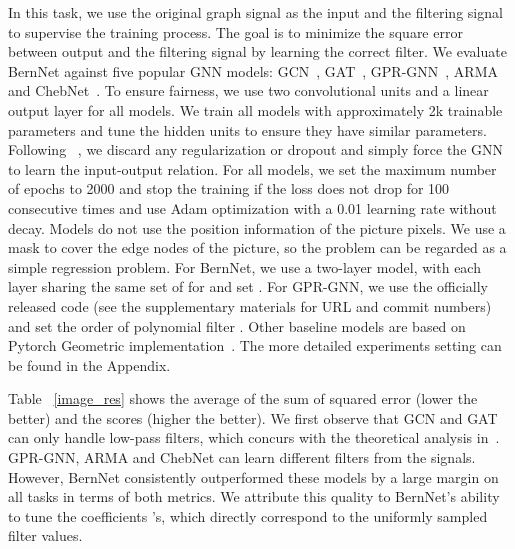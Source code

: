 \documentclass{article}
\begin{document}
In this task, we use the original graph signal as the input and the filtering signal to supervise the training process. The goal is to minimize the square error between output and the filtering signal by learning the correct filter. We evaluate BernNet against  five popular GNN models: GCN~\cite{kipf2016semi}, GAT~\cite{gat}, GPR-GNN~\cite{chien2021GPR-GNN}, ARMA~\cite{bianchi2021ARMA} and ChebNet~\cite{Chebnet}. To ensure fairness, we use two convolutional units and a linear output layer for all models. We train all models with approximately 2k trainable parameters and tune the hidden units to ensure they have similar parameters. Following ~\cite{balcilar2021analyzing}, we discard any regularization or dropout and simply force the GNN to learn the input-output relation. For all models, we set the maximum number of epochs to 2000 and stop the training if the loss does not drop for 100 consecutive times and use Adam optimization with a 0.01 learning rate without decay. Models do not use the position information of the picture pixels. We use a mask to cover the edge nodes of the picture, so the problem can be regarded as a simple regression problem. 
For BernNet, we use a two-layer model, with each layer sharing the same set of  for  and set . For GPR-GNN, we use the officially released code (see the supplementary materials for URL and commit numbers) and set the order of polynomial filter . Other baseline models are based on Pytorch Geometric implementation~\cite{fey2019fast}. The more detailed experiments setting can be found in the Appendix. 


Table ~\ref{image_res} shows the average of the sum of squared error (lower the better) and the  scores (higher the better).
We first observe that GCN and GAT can only handle low-pass filters, which concurs with the theoretical analysis in~\cite{balcilar2021analyzing}. GPR-GNN, ARMA and ChebNet can learn different filters from the signals. However, BernNet consistently outperformed these models by a large margin on all tasks in terms of both metrics. We attribute this quality to BernNet's ability to tune the coefficients 's, which directly correspond to the uniformly sampled filter values.
\end{document}
